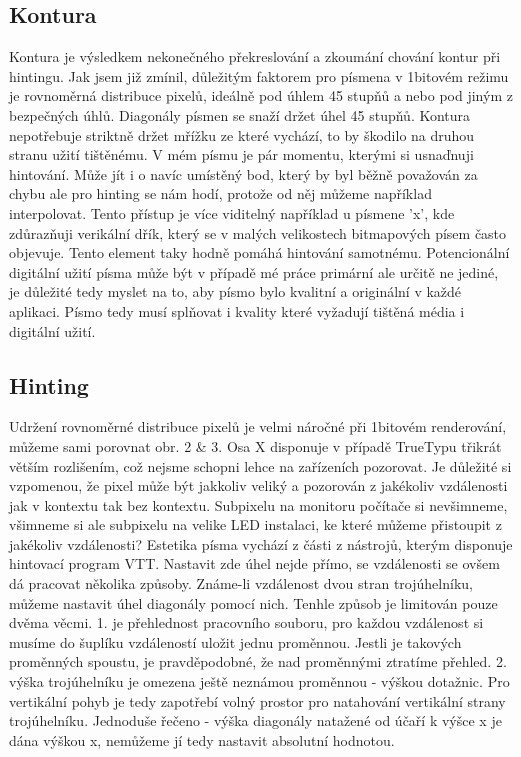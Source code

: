 \documentclass[a4paper]{article}
\begin{document}
\begin{enumerate}
\subsection{Kontura}
Kontura je výsledkem nekonečného překreslování a zkoumání chování kontur při hintingu. Jak jsem již zmínil, důležitým faktorem pro písmena v 1bitovém režimu je rovnoměrná distribuce pixelů, ideálně pod úhlem 45 stupňů a nebo pod jiným z bezpečných úhlů. Diagonály písmen se snaží držet úhel 45 stupňů. Kontura nepotřebuje striktně držet mřížku ze které vychází, to by škodilo na druhou stranu užití tištěnému. V mém písmu je pár momentu, kterými si usnaďnuji hintování. Může jít i o navíc umístěný bod, který by byl běžně považován za chybu ale pro hinting se nám hodí, protože od něj můžeme například interpolovat. Tento přístup je více viditelný například u písmene 'x', kde zdůrazňuji verikální dřík, který se v malých velikostech bitmapových písem často objevuje. Tento element taky hodně pomáhá hintování samotnému. Potencionální digitální užití písma může být v případě mé práce primární ale určitě ne jediné, je důležité tedy myslet na to, aby písmo bylo kvalitní a originální v každé aplikaci. Písmo tedy musí splňovat i kvality které vyžadují tištěná média i digitální užití.
\subsection{Hinting}
Udržení rovnoměrné distribuce pixelů je velmi náročné při 1bitovém renderování, můžeme sami porovnat obr. 2 \& 3. Osa X disponuje v případě TrueTypu třikrát větším rozlišením, což nejsme schopni lehce na zařízeních pozorovat. Je důležité si vzpomenou, že pixel může být jakkoliv veliký a pozorován z jakékoliv vzdálenosti jak v kontextu tak bez kontextu. Subpixelu na monitoru počítače si nevšimneme, všimneme si ale subpixelu na velike LED instalaci, ke které můžeme přistoupit z jakékoliv vzdálenosti? Estetika písma vychází z části z nástrojů, kterým disponuje hintovací program VTT. Nastavit zde úhel nejde přímo, se vzdálenosti se ovšem dá pracovat několika způsoby. Známe-li vzdálenost dvou stran trojúhelníku, můžeme nastavit úhel diagonály pomocí nich. Tenhle způsob je limitován pouze dvěma věcmi. 1. je přehlednost pracovního souboru, pro každou vzdálenost si musíme do šuplíku vzdáleností uložit jednu proměnnou. Jestli je takových proměnných spoustu, je pravděpodobné, že nad proměnnými ztratíme přehled. 2. výška trojúhelníku je omezena ještě neznámou proměnnou - výškou dotažnic. Pro vertikální pohyb je tedy zapotřebí volný prostor pro natahování vertikální strany trojúhelníku. Jednoduše řečeno - výška diagonály natažené od účaří k výšce x je dána výškou x, nemůžeme jí tedy nastavit absolutní hodnotou.

\end{enumerate}
\end{document}
